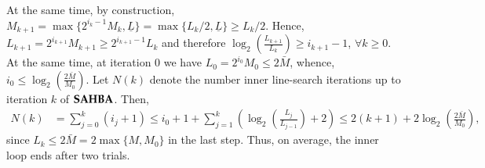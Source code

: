 %
%
%
%
At the same time, by construction, $M_{k+1}= \max\{2^{i_k-1}M_{k},\underline{L}\} = \max\{L_k/2,\underline{L}\} \geq L_k/2 $. Hence, $L_{k+1} = 2^{i_{k+1}} M_{k+1} \geq 2^{i_{k+1}-1} L_k$ and therefore $\log_{2}\left(\frac{L_{k+1}}{L_{k}}\right)\geq i_{k+1}-1$, $\forall k\geq 0$. At the same time, at iteration $0$ we have $L_0=2^{i_0} M_0 \leq 2\bar{M}$, whence, $i_0 \leq \log_2\left(\frac{2\bar{M}}{M_0}\right)$.
Let $N(k)$ denote the number inner line-search iterations up to iteration $k$ of $\operatorname{\mathbf{SAHBA}}$. Then, 
\begin{align*}
N(k)&=\sum_{j=0}^{k}(i_{j}+1)\leq i_0+1 + \sum_{j=1}^{k}\left(\log_{2}\left(\frac{L_{j}}{L_{j-1}}\right)+2\right) 
\leq 2(k+1) + 2 \log_2\left(\frac{2\bar{M}}{M_0}\right),
\end{align*}
since $L_{k} \leq 2\bar{M}= 2\max\{M,M_0\}$ in the last step. Thus, on average, the inner loop ends after two trials. 





